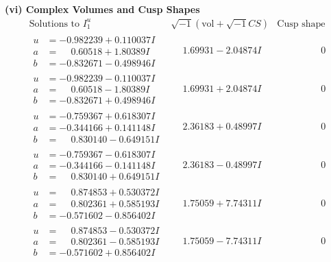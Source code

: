 \documentclass[1p]{elsarticle_modified}
\theoremstyle{definition}
\newcommand{\I}{\sqrt{-1}}
\begin{document}
\newpage\flushleft \textbf{(vi) Complex Volumes and Cusp Shapes}
$$\begin{array}{c|c|c}  
\text{Solutions to }I^u_{1}& \I (\text{vol} + \sqrt{-1}CS) & \text{Cusp shape}\\
 \hline 
\begin{aligned}
u &= -0.982239 + 0.110037 I \\
a &= \phantom{-}0.60518 + 1.80389 I \\
b &= -0.832671 - 0.498946 I\end{aligned}
 & \phantom{-}1.69931 - 2.04874 I & \phantom{-0.000000 } 0 \\ \hline\begin{aligned}
u &= -0.982239 - 0.110037 I \\
a &= \phantom{-}0.60518 - 1.80389 I \\
b &= -0.832671 + 0.498946 I\end{aligned}
 & \phantom{-}1.69931 + 2.04874 I & \phantom{-0.000000 } 0 \\ \hline\begin{aligned}
u &= -0.759367 + 0.618307 I \\
a &= -0.344166 + 0.141148 I \\
b &= \phantom{-}0.830140 - 0.649151 I\end{aligned}
 & \phantom{-}2.36183 + 0.48997 I & \phantom{-0.000000 } 0 \\ \hline\begin{aligned}
u &= -0.759367 - 0.618307 I \\
a &= -0.344166 - 0.141148 I \\
b &= \phantom{-}0.830140 + 0.649151 I\end{aligned}
 & \phantom{-}2.36183 - 0.48997 I & \phantom{-0.000000 } 0 \\ \hline\begin{aligned}
u &= \phantom{-}0.874853 + 0.530372 I \\
a &= \phantom{-}0.802361 + 0.585193 I \\
b &= -0.571602 - 0.856402 I\end{aligned}
 & \phantom{-}1.75059 + 7.74311 I & \phantom{-0.000000 } 0 \\ \hline\begin{aligned}
u &= \phantom{-}0.874853 - 0.530372 I \\
a &= \phantom{-}0.802361 - 0.585193 I \\
b &= -0.571602 + 0.856402 I\end{aligned}
 & \phantom{-}1.75059 - 7.74311 I & \phantom{-0.000000 } 0 \\ \hline\begin{aligned}

\end{aligned}
\end{array}$$
\end{document}
